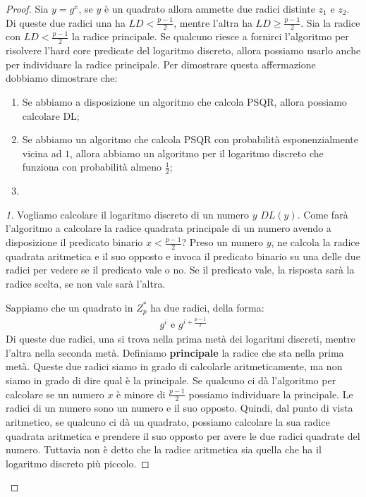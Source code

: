 \begin{proof}
Sia $y = g^x$, se $y$ è un quadrato allora ammette due radici distinte $z_1$ e $z_2$. Di queste due radici una ha $LD < \frac{p-1}{2}$, mentre l'altra ha $LD \ge \frac{p-1}{2}$. Sia la radice con $LD < \frac{p-1}{2}$ la radice principale. Se qualcuno riesce a fornirci l'algoritmo per risolvere l'hard core predicate del logaritmo discreto, allora possiamo usarlo anche per individuare la radice principale. Per dimostrare questa affermazione dobbiamo dimostrare che:
\begin{enumerate}
    \item Se abbiamo a disposizione un algoritmo che calcola PSQR, allora possiamo calcolare  DL;
    \item Se abbiamo un algoritmo che calcola PSQR con probabilità esponenzialmente vicina ad $1$, allora abbiamo un algoritmo per il logaritmo discreto che funziona con probabilità almeno $\frac{1}{2}$;
    \item
\end{enumerate}

\begin{proof}[1]
Vogliamo calcolare il logaritmo discreto di un numero $y$ $DL(y)$. Come farà l'algoritmo a calcolare la radice quadrata principale di un numero avendo a disposizione il predicato binario $x < \frac{p-1}{2}$? Preso un numero $y$, ne calcola la radice quadrata aritmetica e il suo opposto e invoca il predicato binario su una delle due radici per vedere se il predicato vale o no. Se il predicato vale, la risposta sarà la radice scelta, se non vale sarà l'altra. 

Sappiamo che un quadrato in $Z_p^*$ ha due radici, della forma:
\begin{align*}
    g^i \text{ e } g^{i+\frac{p-1}{2}}
\end{align*}
\noindent Di queste due radici, una si trova nella prima metà dei logaritmi discreti, mentre l'altra nella seconda metà. Definiamo \textbf{principale} la radice che sta nella prima metà. Queste due radici siamo in grado di calcolarle aritmeticamente, ma non siamo in grado di dire qual è la principale. Se qualcuno ci dà l'algoritmo per calcolare se un numero $x$ è minore di $\frac{p-1}{2}$ possiamo individuare la principale. Le radici di un numero sono un numero e il suo opposto. Quindi, dal punto di vista aritmetico, se qualcuno ci dà un quadrato, possiamo calcolare la sua radice quadrata aritmetica e prendere il suo opposto per avere le due radici quadrate del numero. Tuttavia non è detto che la radice aritmetica sia quella che ha il logaritmo discreto più piccolo. 


\end{proof}
\end{proof}
